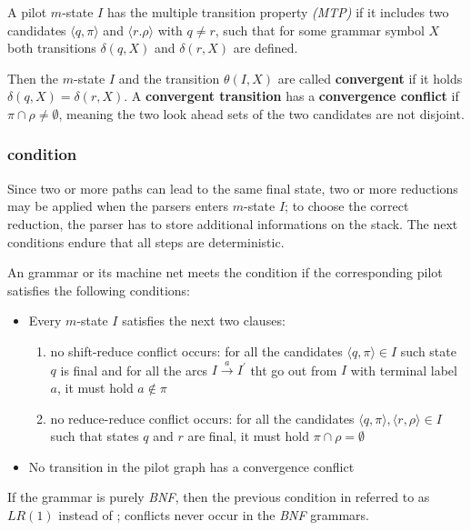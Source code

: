 \documentclass[english]{article}
\begin{document}
\bigskip
A pilot \(m\)-state \(I\) has the multiple transition property \textit{(MTP)} if it includes two candidates \(\langle q, \pi \rangle\) and \(\langle r. \rho\rangle\) with \(q \neq r\), such that for some grammar symbol \(X\) both transitions \(\delta(q, X)\) and \(\delta(r, X)\) are defined.

Then the \(m\)-state \(I\) and the transition \(\theta(I, X)\) are called \textbf{convergent} if it holds \(\delta(q, X) = \delta(r, X)\).
A \textbf{convergent transition} has a \textbf{convergence conflict} if \(\pi \cap \rho \neq \emptyset\), meaning the two look ahead sets of the two candidates are not disjoint.

\subsubsection[ELR(1) condition]{\ELRo condition}
\label{sec:elro-condition}

Since two or more paths can lead to the same final state, two or more reductions may be applied when the parsers enters \(m\)-state \(I\);
to choose the correct reduction, the parser has to store additional informations on the stack.
The next conditions endure that all steps are deterministic.

\bigskip
An \EBNF grammar or its machine net meets the condition \ELRo if the corresponding pilot satisfies the following conditions:

\begin{itemize}
  \item Every \(m\)-state \(I\) satisfies the next two clauses:
        \begin{enumerate}
          \item no shift-reduce conflict occurs: for all the candidates \(\langle q, \pi \rangle \in I\) such state \(q\) is final and for all the arcs \(I \xrightarrow{a} I^\prime\) tht go out from \(I\) with terminal label \(a\), it must hold \(a \notin \pi\)
          \item no reduce-reduce conflict occurs: for all the candidates \(\langle q, \pi \rangle, \langle r, \rho \rangle \in I\) such that states \(q\) and \(r\) are final, it must hold \(\pi \cap \rho = \emptyset\)
        \end{enumerate}
  \item No transition in the pilot graph has a convergence conflict
\end{itemize}

If the grammar is purely \textit{BNF}, then the previous condition in referred to as \(\textit{LR}(1)\) instead of \ELRo;
conflicts never occur in the \textit{BNF} grammars.
\end{document}
